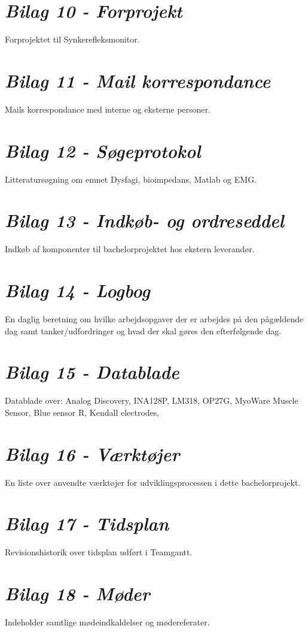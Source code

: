 \section*{\textit{Bilag 10 - Forprojekt}} \label{bilag10}
Forprojektet til Synkerefleksmonitor.
\section*{\textit{Bilag 11 - Mail korrespondance}} \label{bilag11}
Mails korrespondance med interne og eksterne personer.
\section*{\textit{Bilag 12 - Søgeprotokol}} \label{bilag12}
Litteratursøgning om emnet Dysfagi, bioimpedans, Matlab og EMG. 
\section*{\textit{Bilag 13 - Indkøb- og ordreseddel}} \label{bilag13}
Indkøb af komponenter til bachelorprojektet hos ekstern leverandør.
\section*{\textit{Bilag 14 - Logbog}} \label{bilag14}
En daglig beretning om hvilke arbejdsopgaver der er arbejdes på den pågældende dag samt tanker/udfordringer og hvad der skal gøres den efterfølgende dag.
\section*{\textit{Bilag 15 - Datablade}} \label{bilag15}
Datablade over: Analog Discovery, INA128P, LM318, OP27G, MyoWare Muscle Sensor, Blue sensor R, Kendall electrodes,
\section*{\textit{Bilag 16 - Værktøjer}} \label{bilag16}
En liste over anvendte værktøjer for udviklingsprocessen i dette bachelorprojekt.
\section*{\textit{Bilag 17 - Tidsplan}} \label{bilag17}
Revisionshistorik over tidsplan udført i Teamgantt.
\section*{\textit{Bilag 18 - Møder}} \label{bilag18}
Indeholder samtlige mødeindkaldelser og mødereferater.





